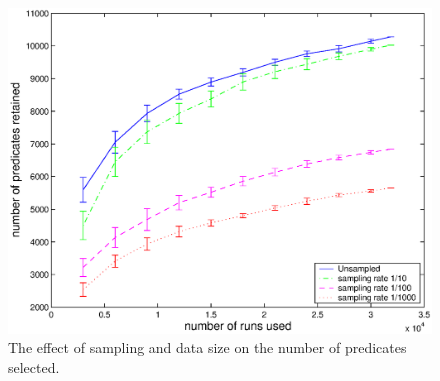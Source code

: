 \begin{figure}
\centering
\includegraphics[width=\columnwidth]{predkept3a}
\caption{The effect of sampling and data size on the number of
  predicates selected.}
\label{fig:predkept}
\end{figure}




